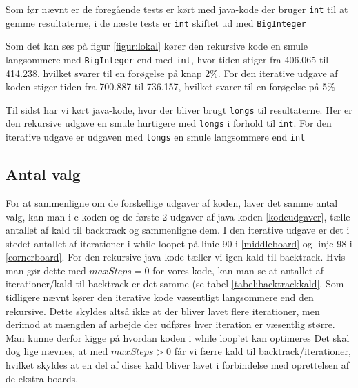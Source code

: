 
Som før nævnt er de foregående tests er kørt med java-kode der bruger \texttt{int} til at gemme resultaterne,
i de næste tests er \texttt{int} skiftet ud med \texttt{BigInteger} 

Som det kan ses på figur \ref{figur:lokal} kører den rekursive kode en smule
langsommere med \texttt{BigInteger} end med \texttt{int}, hvor tiden stiger fra
406.065 til 414.238, hvilket svarer til en forøgelse
på knap 2\%. For den iterative udgave af koden stiger tiden fra 700.887 til
736.157, hvilket svarer til en forøgelse på 5\% 

Til sidst har vi kørt java-kode, hvor der bliver brugt \texttt{longs} til
resultaterne. Her er den rekursive udgave en smule hurtigere med \texttt{longs}
i forhold til \texttt{int}. For den iterative udgave er udgaven med
\texttt{longs} en smule langsommere end \texttt{int} 

\subsection{Antal valg}

For at sammenligne om de forskellige udgaver af koden, laver det samme antal
valg, kan man i c-koden og de første 2 udgaver af java-koden \ref{kodeudgaver},
tælle antallet af kald til backtrack og sammenligne dem.  I den iterative udgave
er det i stedet antallet af iterationer i while loopet på linie 90 i
\ref{middleboard} og linje 98 i \ref{cornerboard}. For den rekursive
java-kode tæller vi igen kald til backtrack. Hvis man gør dette med $maxSteps=0$
for vores kode, kan man se at antallet af iterationer/kald til backtrack er det
samme (se tabel \ref{tabel:backtrackkald}. Som tidligere nævnt kører den
iterative kode væsentligt langsommere end den rekursive. Dette skyldes altså
ikke at der bliver lavet flere iterationer, men derimod at mængden af arbejde
der udføres hver iteration er væsentlig større. Man kunne derfor kigge på
hvordan koden i while loop'et kan optimeres Det skal dog lige nævnes, at med
$maxSteps>0$ får vi færre kald til backtrack/iterationer, hvilket skyldes at en
del af disse kald bliver lavet i forbindelse med oprettelsen af de ekstra
boards. 

